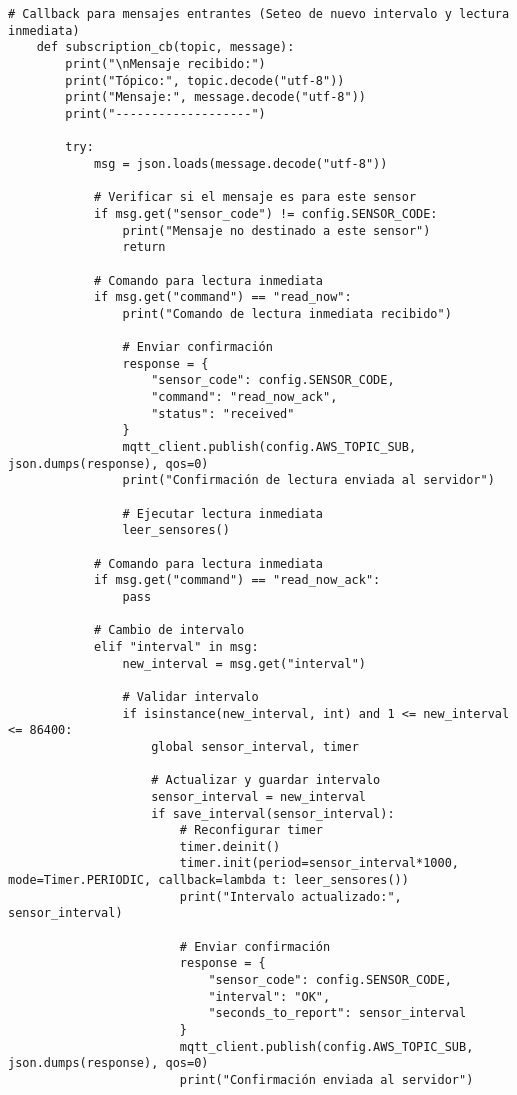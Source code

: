 \begin{lstlisting}[label=cod:firmware,caption=Firmware nodo sensor de consumos. , language=PythonUTF8]
    # Callback para mensajes entrantes (Seteo de nuevo intervalo y lectura inmediata)
    def subscription_cb(topic, message):
        print("\nMensaje recibido:")
        print("Tópico:", topic.decode("utf-8"))
        print("Mensaje:", message.decode("utf-8"))
        print("-------------------")
        
        try:
            msg = json.loads(message.decode("utf-8"))
            
            # Verificar si el mensaje es para este sensor
            if msg.get("sensor_code") != config.SENSOR_CODE:
                print("Mensaje no destinado a este sensor")
                return
            
            # Comando para lectura inmediata
            if msg.get("command") == "read_now":
                print("Comando de lectura inmediata recibido")
                
                # Enviar confirmación
                response = {
                    "sensor_code": config.SENSOR_CODE,
                    "command": "read_now_ack",
                    "status": "received"
                }
                mqtt_client.publish(config.AWS_TOPIC_SUB, json.dumps(response), qos=0)
                print("Confirmación de lectura enviada al servidor")
                
                # Ejecutar lectura inmediata
                leer_sensores()
                
            # Comando para lectura inmediata
            if msg.get("command") == "read_now_ack":
                pass
            
            # Cambio de intervalo
            elif "interval" in msg:
                new_interval = msg.get("interval")
                
                # Validar intervalo
                if isinstance(new_interval, int) and 1 <= new_interval <= 86400:
                    global sensor_interval, timer
                    
                    # Actualizar y guardar intervalo
                    sensor_interval = new_interval
                    if save_interval(sensor_interval):
                        # Reconfigurar timer
                        timer.deinit()
                        timer.init(period=sensor_interval*1000, mode=Timer.PERIODIC, callback=lambda t: leer_sensores())
                        print("Intervalo actualizado:", sensor_interval)
                        
                        # Enviar confirmación
                        response = {
                            "sensor_code": config.SENSOR_CODE,
                            "interval": "OK",
                            "seconds_to_report": sensor_interval
                        }
                        mqtt_client.publish(config.AWS_TOPIC_SUB, json.dumps(response), qos=0)
                        print("Confirmación enviada al servidor")
            

\end{lstlisting}
